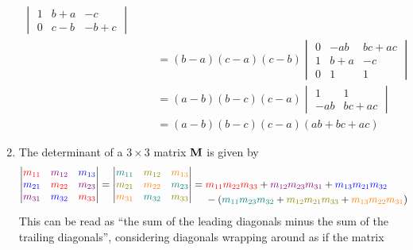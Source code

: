 \documentclass[fleqn,a4paper,11pt]{article}
\begin{document}
\begin{enumerate}[label=\textbf{\arabic*.}]
\begin{alignat*}
\begin{vmatrix}
      1 & b + a & -c \\
      0 & c - b & -b + c
     \end{vmatrix} \\
    && &= (b - a)(c - a)(c - b)\begin{vmatrix}
      0 & -ab & bc + ac \\
      1 & b + a & -c \\
      0 & 1 & 1
     \end{vmatrix} \\
    && &= (a - b)(b - c)(c - a)\begin{vmatrix}
      1 & 1 \\
      -ab & bc + ac
     \end{vmatrix} \\
    && &= (a - b)(b - c)(c - a)(ab + bc + ac)
   \end{alignat*}
  \item
   \begin{lemma}
    \label{lemma_sarrus}
    The determinant of a \(3 \times 3\) matrix \(\mathbf{M}\) is given by
    \begin{align*}
     \begin{vmatrix}
      \color{red}m_{11} & \color{violet}m_{12} & \color{blue}m_{13} \\
      \color{blue}m_{21} & \color{red}m_{22} & \color{violet}m_{23} \\
      \color{violet}m_{31} & \color{blue}m_{32} & \color{red}m_{33}
     \end{vmatrix} =
     \begin{vmatrix}
      \color{teal}m_{11} & \color{olive}m_{12} & \color{orange}m_{13} \\
      \color{olive}m_{21} & \color{orange}m_{22} & \color{teal}m_{23} \\
      \color{orange}m_{31} & \color{teal}m_{32} & \color{olive}m_{33}
     \end{vmatrix} &=
     \begin{aligned}[t]
      &  \textcolor{red}{m_{11} m_{22} m_{33}}
       + \textcolor{violet}{m_{12} m_{23} m_{31}}
       + \textcolor{blue}{m_{13} m_{21} m_{32}} \\
      &-(\textcolor{teal}{m_{11} m_{23} m_{32}}
       + \textcolor{olive}{m_{12} m_{21} m_{33}}
       + \textcolor{orange}{m_{13} m_{22} m_{31}})
     \end{aligned}
    \end{align*}
    This can be read as ``the sum of the leading diagonals minus the sum of the
    trailing diagonals'', considering diagonals wrapping around as if the matrix

\end{lemma}
\end{enumerate}
\end{document}
